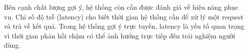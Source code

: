 Bên cạnh chất lượng gợi ý, hệ thống còn cần được đánh giá về hiệu năng phục vụ. Chỉ số độ trễ (latency) cho biết thời gian hệ thống cần để xử lý một request và trả về kết quả. Trong hệ thống gợi ý trực tuyến, latency là yếu tố quan trọng vì thời gian phản hồi chậm có thể ảnh hưởng trực tiếp đến trải nghiệm người dùng.
